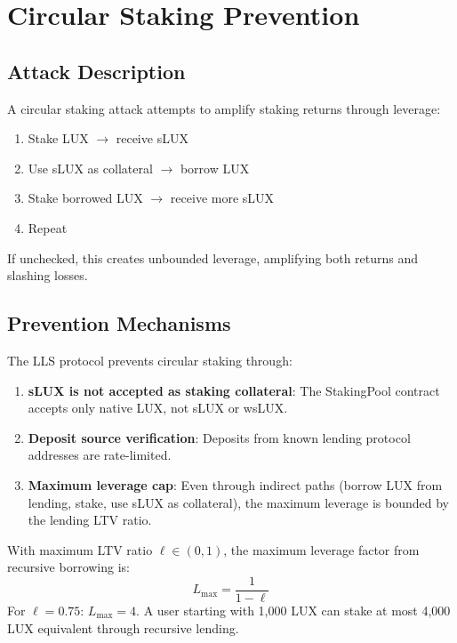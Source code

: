 \section{Circular Staking Prevention}
\label{sec:circular}

\subsection{Attack Description}

A circular staking attack attempts to amplify staking returns through leverage:
\begin{enumerate}
    \item Stake LUX $\to$ receive sLUX
    \item Use sLUX as collateral $\to$ borrow LUX
    \item Stake borrowed LUX $\to$ receive more sLUX
    \item Repeat
\end{enumerate}

If unchecked, this creates unbounded leverage, amplifying both returns and slashing losses.

\subsection{Prevention Mechanisms}

\begin{definition}
The LLS protocol prevents circular staking through:
\begin{enumerate}
    \item \textbf{sLUX is not accepted as staking collateral}: The StakingPool contract accepts only native LUX, not sLUX or wsLUX.
    \item \textbf{Deposit source verification}: Deposits from known lending protocol addresses are rate-limited.
    \item \textbf{Maximum leverage cap}: Even through indirect paths (borrow LUX from lending, stake, use sLUX as collateral), the maximum leverage is bounded by the lending LTV ratio.
\end{enumerate}
\end{definition}

\begin{theorem}
With maximum LTV ratio $\ell \in (0, 1)$, the maximum leverage factor from recursive borrowing is:
\begin{equation}
    L_{\max} = \frac{1}{1 - \ell}
\end{equation}
For $\ell = 0.75$: $L_{\max} = 4$. A user starting with 1,000 LUX can stake at most 4,000 LUX equivalent through recursive lending.
\end{theorem}

